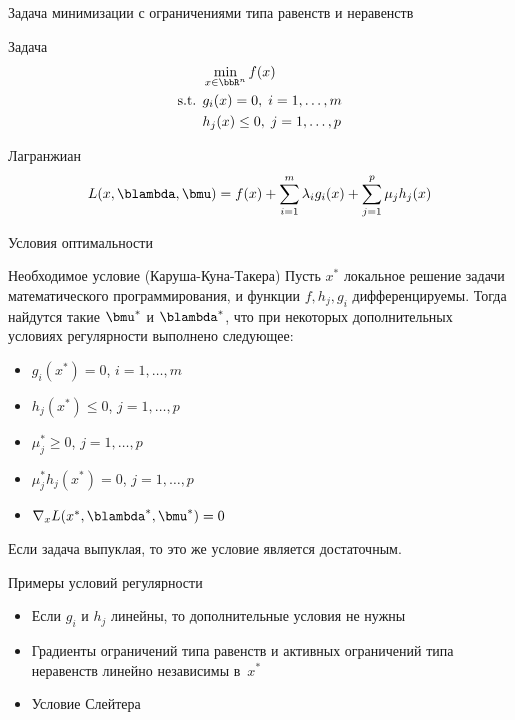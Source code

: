 \documentclass[12pt]{beamer}
\begin{document}
\begin{frame}{{\small Задача минимизации с ограничениями типа равенств и неравенств}}

\begin{block}{Задача}
\vspace{-5mm}
\begin{equation*}
\begin{split}
& \min\limits_{x \in \bbR^n} f(x)\\
\text{s.t. } & g_i(x) = 0, \; i = 1,\ldots,m\\
& h_j(x) \leq 0, \; j = 1,\ldots, p
\end{split}
\end{equation*}
\end{block}

\begin{block}{Лагранжиан}
\begin{equation*}
L(x, \blambda, \bmu) = f(x) + \sum\limits_{i=1}^m\lambda_i g_i(x) + \sum\limits_{j=1}^p \mu_j h_j(x)
\end{equation*}
\end{block}
\end{frame}

\begin{frame}{Условия оптимальности}
\begin{block}{Необходимое условие (Каруша-Куна-Такера)}
Пусть $x^*$ локальное решение задачи математического программирования, и функции $f, h_j, g_i$ дифференцируемы. 
Тогда найдутся такие $\bmu^*$ и $\blambda^*$, что при некоторых дополнительных условиях регулярности выполнено следующее:
\begin{itemize}
\item $g_i(x^*) = 0$, $i = 1,\ldots,m$
\item $h_j(x^*) \leq 0$, $j = 1,\ldots,p$
\item $ \mu^*_j \geq 0$, $j = 1,\ldots,p$
\item $\mu^*_jh_j(x^*) = 0$, $j = 1,\ldots,p$
\item $\nabla_x L(x^*, \blambda^*, \bmu^*) = 0$
\end{itemize}
\end{block}
Если задача выпуклая, то это же условие является достаточным.
\end{frame}

\begin{frame}{Примеры условий регулярности}
\begin{itemize}
\item Если $g_i$ и $h_j$ линейны, то дополнительные условия не нужны
\item Градиенты ограничений типа равенств и активных ограничений типа неравенств линейно независимы в~$x^*$
\item Условие Слейтера
\end{itemize}
\end{frame}
\end{document}
